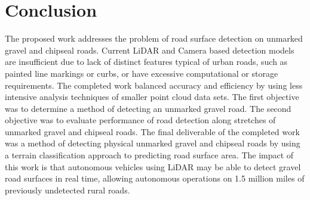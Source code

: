 \documentclass[numbered,pdftex]{ohio-etd}
\begin{document}
\chapter{Conclusion}{
	
	{The proposed work addresses the problem of road surface detection on unmarked gravel and chipseal roads. Current LiDAR and Camera based detection models are insufficient due to lack of distinct features typical of urban roads, such as painted line markings or curbs, or have excessive computational or storage requirements. The completed work balanced accuracy and efficiency by using less intensive analysis techniques of smaller point cloud data sets. The first objective was to determine a method of detecting an unmarked gravel road. The second objective was to evaluate performance of road detection along stretches of unmarked gravel and chipseal roads. The final deliverable of the completed work was a method of detecting physical unmarked gravel and chipseal roads by using a terrain classification approach to predicting road surface area. The impact of this work is that autonomous vehicles using LiDAR may be able to detect gravel road surfaces in real time, allowing autonomous operations on 1.5 million miles of previously undetected rural roads.}

}


%
%	
%	
%	
%	
%	
		
%			
%			
%			
%			
%				
		
\end{document}
